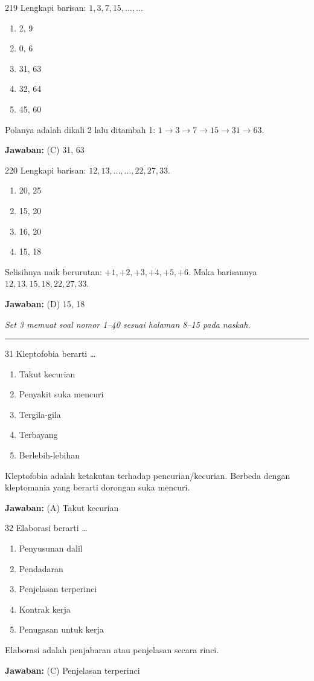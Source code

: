 \documentclass[11pt]{article}
\newenvironment{pil}{\begin{enumerate}[label=(\Alph*),leftmargin=*,itemsep=1pt,topsep=3pt]}{\end{enumerate}}
\newcommand{\jw}[1]{\par\smallskip\begin{jawbox}\textbf{Jawaban:} #1\end{jawbox}}
\newcommand{\setjudul}[2]{\clearpage{\noindent\Large\bfseries #1\par}\smallskip
{\noindent\small\itshape #2\par}\medskip\hrule\medskip}
\begin{document}
\begin{soalbox}{2}{19}
Lengkapi barisan: $1, 3, 7, 15, \ldots, \ldots$
\begin{pil}\item 2, 9 \item 0, 6 \item 31, 63 \item 32, 64 \item 45, 60\end{pil}
\end{soalbox}
\begin{pembox}
Polanya adalah dikali 2 lalu ditambah 1: $1\to3\to7\to15\to31\to63$.
\jw{(C) 31, 63}
\end{pembox}

\begin{soalbox}{2}{20}
Lengkapi barisan: $12, 13, \ldots, \ldots, 22, 27, 33$.
\begin{pil}\item 20, 25 \item 15, 20 \item 16, 20 \item 15, 18\end{pil}
\end{soalbox}
\begin{pembox}
Selisihnya naik berurutan: $+1, +2, +3, +4, +5, +6$. Maka barisannya $12, 13, 15, 18, 22, 27, 33$.
\jw{(D) 15, 18}
\end{pembox}

\setjudul{3\quad Set 3}{Set 3 memuat soal nomor 1--40 sesuai halaman 8--15 pada naskah.}

\begin{soalbox}{3}{1}
Kleptofobia berarti \ldots
\begin{pil}\item Takut kecurian \item Penyakit suka mencuri \item Tergila-gila \item Terbayang \item Berlebih-lebihan\end{pil}
\end{soalbox}
\begin{pembox}
Kleptofobia adalah ketakutan terhadap pencurian/kecurian. Berbeda dengan kleptomania yang berarti dorongan suka mencuri.
\jw{(A) Takut kecurian}
\end{pembox}

\begin{soalbox}{3}{2}
Elaborasi berarti \ldots
\begin{pil}\item Penyusunan dalil \item Pendadaran \item Penjelasan terperinci \item Kontrak kerja \item Penugasan untuk kerja\end{pil}
\end{soalbox}
\begin{pembox}
Elaborasi adalah penjabaran atau penjelasan secara rinci.
\jw{(C) Penjelasan terperinci}
\end{pembox}
\end{document}
